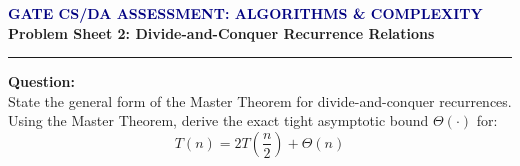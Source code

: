 \documentclass[11pt,a4paper]{article}
\begin{document}
\begin{center}
    {\large\bfseries\textcolor{navy}{GATE CS/DA ASSESSMENT: ALGORITHMS \& COMPLEXITY}}\\[0.2cm]
    {\bfseries Problem Sheet 2: Divide-and-Conquer Recurrence Relations}
\end{center}
\hrule
\vspace{0.6cm}

\noindent\textbf{Question:}\\
State the general form of the Master Theorem for divide-and-conquer recurrences. Using the Master Theorem, derive the exact tight asymptotic bound $\Theta(\cdot)$ for:
\[
T(n) = 2T\left(\frac{n}{2}\right) + \Theta(n)
\]
\end{document}
